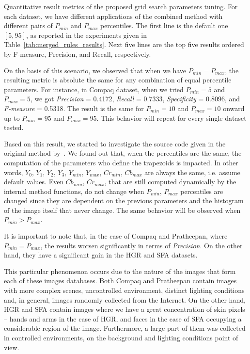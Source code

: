 \begin{table*}[ht]
\caption[Quantitative result metrics of the proposed grid search parameters tuning]{Quantitative result metrics of the proposed grid search parameters tuning. For each dataset, we have different applications of the combined method with different pairs of $P_{min}$ and $P_{max}$ percentiles. The first line is the default one $[5, 95]$, as reported in the experiments given in Table~\ref{tab:merged_rules_results}. Next five lines are the top five results ordered by F-measure, Precision, and Recall, respectively.}
\label{tab:gs_results_comparison}

\end{table*}

On the basis of this scenario, we observed that when we have $P_{min} = P_{max}$, the resulting metric is absolute the same for any combination of equal percentile parameters. For instance, in Compaq dataset, when we tried $P_{min} = 5$ and $P_{max} = 5$, we got \emph{Precision} = 0.4172, \emph{Recall} = 0.7333, \emph{Specificity} = 0.8096, and \emph{F-measure} = 0.5318. The result is the same for $P_{min} = 10$ and $P_{max} = 10$ onward up to $P_{min} = 95$ and $P_{max} = 95$. This behavior will repeat for every single dataset tested.

Based on this result, we started to investigate the source code given in the original method by~\citet{brancati:17}. We found out that, when the percentiles are the same, the computation of the parameters who define the trapezoids is impacted. In other words, $Y_0$, $Y_1$, $Y_2$, $Y_3$, $Y_{min}$, $Y_{max}$, $Cr_{min}$, $Cb_{max}$ are always the same, i.e. assume default values. Even $Cb_{min}$, $Cr_{max}$, that are still computed dynamically by the internal method functions, do not change when $P_{min}$, $P_{max}$ percentiles are changed since they are dependent on the previous parameters and the histogram of the image itself that never change. The same behavior will be observed when $P_{min} > P_{max}$.

It is important to note that, in the case of Compaq and Pratheepan, where $P_{min} = P_{max}$, the results worsen significantly in terms of \emph{Precision}. On the other hand, they have a significant gain in the HGR and SFA datasets.

This particular phenomenon occurs due to the nature of the images that form each of these images databases. Both Compaq and Pratheepan contain images with more complex scenes, uncontrolled environment, distinct lighting conditions and, in general, images randomly collected from the Internet. On the other hand, HGR and SFA contain images where we have a great concentration of skin pixels -- hands and arms in the case of HGR, and faces in the case of SFA occupying a considerable region of the image. Furthermore, a large part of them was collected in controlled environments, on the background and lighting conditions point of view.

